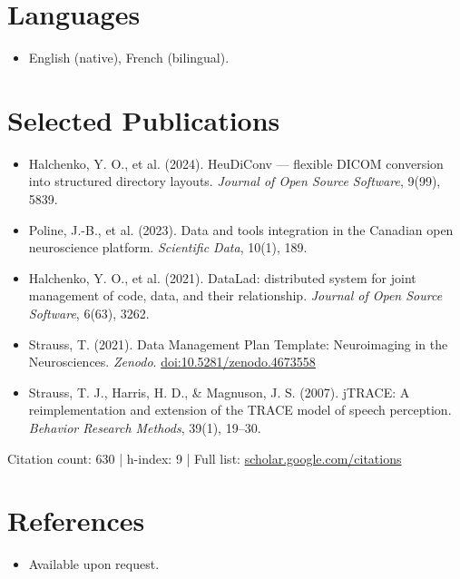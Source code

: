 \documentclass[11pt,a4paper,sans]{moderncv}
\begin{document}

\section{Languages}
\vspace{1pt}
\begin{itemize}
\item English (native), French (bilingual).
\end{itemize}


\section{Selected Publications}
\vspace{1pt}
\begin{itemize}
\item Halchenko, Y. O., et al. (2024). HeuDiConv --- flexible DICOM conversion into structured directory layouts. \textit{Journal of Open Source Software}, 9(99), 5839.
\item Poline, J.-B., et al. (2023). Data and tools integration in the Canadian open neuroscience platform. \textit{Scientific Data}, 10(1), 189.
\item Halchenko, Y. O., et al. (2021). DataLad: distributed system for joint management of code, data, and their relationship. \textit{Journal of Open Source Software}, 6(63), 3262.
\item Strauss, T. (2021). Data Management Plan Template: Neuroimaging in the Neurosciences. \textit{Zenodo}. \href{https://doi.org/10.5281/zenodo.4673558}{doi:10.5281/zenodo.4673558}
\item Strauss, T. J., Harris, H. D., \& Magnuson, J. S. (2007). jTRACE: A reimplementation and extension of the TRACE model of speech perception. \textit{Behavior Research Methods}, 39(1), 19--30.
\end{itemize}
\vspace{1pt}
\small{Citation count: 630 | h-index: 9 | Full list: \href{https://scholar.google.com/citations}{scholar.google.com/citations}}


\section{References}
\vspace{1pt}
\begin{itemize}
\item{Available upon request.}
\end{itemize}
\end{document}
